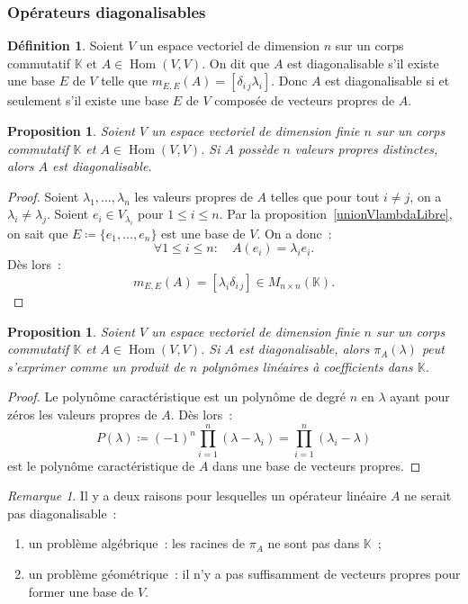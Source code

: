 \documentclass{article}
\DeclareMathOperator{\Hom}{Hom}
\newcommand{\K}{\mathbb K}
\newcommand{\M}[3]{M_{#1 \times #2}(#3)}
\newtheorem{prp}[thm]{Proposition}
\theoremstyle{definition}
\newtheorem{déf}[thm]{Définition}
\theoremstyle{remark}
\newtheorem*{rmq}{Remarque}
\begin{document}
		\subsubsection{Opérateurs diagonalisables}
		\begin{déf} Soient $V$ un espace vectoriel de dimension $n$ sur un corps commutatif $\K$ et $A \in \Hom(V, V)$. On dit que $A$ est diagonalisable
		s'il existe une base $E$ de $V$ telle que $m_{E, E}(A) = [\delta_{i\,j}\lambda_i]$. Donc $A$ est diagonalisable si et seulement s'il existe une base $E$ de
		$V$ composée de vecteurs propres de $A$. \end{déf}

		\begin{prp}\label{nvalpropresdiagonalisable} Soient $V$ un espace vectoriel de dimension finie $n$ sur un corps commutatif $\K$ et $A \in \Hom(V, V)$. Si $A$
		possède $n$ valeurs propres distinctes, alors $A$ est diagonalisable. \end{prp}

		\begin{proof} Soient $\lambda_1, \dotsc, \lambda_n$ les valeurs propres de $A$ telles que pour tout $i \neq j$, on a $\lambda_i \neq \lambda_j$.
		Soient $e_i \in V_{\lambda_i}$ pour $1 \leq i \leq n$. Par la proposition~\ref{unionVlambdaLibre}, on sait que $E \coloneqq \{e_1, \dotsc, e_n\}$ est une base de
		$V$. On a donc~:
		\[\forall 1 \leq i \leq n : \quad A(e_i) = \lambda_ie_i.\]
		Dès lors~:
		\[m_{E, E}(A) = [\lambda_i\delta_{i\,j}] \in \M nn\K.\] \end{proof}

		\begin{prp}\label{diagonalisablepolcarprod} Soient $V$ un espace vectoriel de dimension finie $n$ sur un corps commutatif $\K$ et $A \in \Hom(V, V)$.
		Si $A$ est diagonalisable, alors $\pi_A(\lambda)$ peut s'exprimer comme un produit de $n$ polynômes linéaires à coefficients dans $\K$. \end{prp}

		\begin{proof} Le polynôme caractéristique est un polynôme de degré $n$ en $\lambda$ ayant pour zéros les valeurs propres de $A$. Dès lors~:
		\[P(\lambda) \coloneqq (-1)^n\prod_{i=1}^n(\lambda - \lambda_i) = \prod_{i=1}^n(\lambda_i - \lambda)\]
		est le polynôme caractéristique de $A$ dans une base de vecteurs propres. \end{proof}

		\begin{rmq} Il y a deux raisons pour lesquelles un opérateur linéaire $A$ ne serait pas diagonalisable~:
		\begin{enumerate}
			\item un problème algébrique~: les racines de $\pi_A$ ne sont pas dans $\K$~;
			\item un problème géométrique~: il n'y a pas suffisamment de vecteurs propres pour former une base de $V$.
		\end{enumerate}
		\end{rmq}
\end{document}
